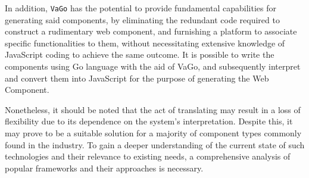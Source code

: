 In addition, \texttt{VaGo} has the potential to provide fundamental
capabilities for generating said components, by eliminating the
redundant code required to construct a rudimentary web component, and
furnishing a platform to associate specific functionalities to them,
without necessitating extensive knowledge of JavaScript coding to
achieve the same outcome. It is possible to write the components using
Go language with the aid of VaGo, and subsequently interpret and convert
them into JavaScript for the purpose of generating the Web Component.

Nonetheless, it should be noted that the act of translating may result
in a loss of flexibility due to its dependence on the system's
interpretation. Despite this, it may prove to be a suitable solution for
a majority of component types commonly found in the industry. To gain a
deeper understanding of the current state of such technologies and their
relevance to existing needs, a comprehensive analysis of popular
frameworks and their approaches is necessary.

